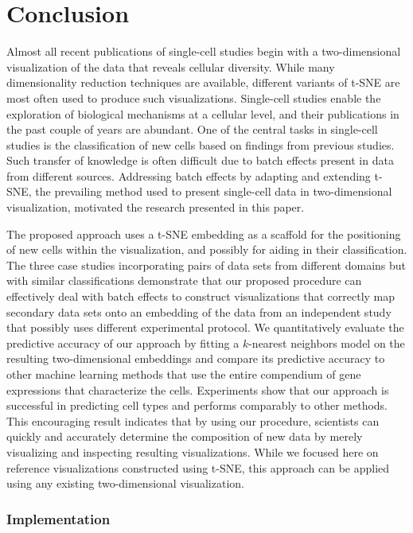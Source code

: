 \documentclass[runningheads]{llncs}
\begin{document}
\section{Conclusion}

Almost all recent publications of single-cell studies begin with a
two-dimensional visualization of the data that reveals cellular diversity.
While many dimensionality reduction techniques are available, different 
variants of t-SNE are most often used to produce such
visualizations. Single-cell studies enable the exploration of biological mechanisms at a
cellular level, and their publications in the past couple of years are abundant.
One of the central tasks in single-cell
studies is the classification of new cells based on findings from previous
studies. Such transfer of knowledge is often difficult due to batch effects
present in data from different sources. Addressing batch effects by adapting
and extending t-SNE, the prevailing method used to present single-cell data in
two-dimensional visualization, motivated the research presented in this paper.

The proposed approach uses a t-SNE embedding as a scaffold for the positioning of new cells within the visualization, and possibly for aiding in their classification. The three case studies incorporating pairs of data sets from different domains but with similar classifications demonstrate that our proposed procedure can effectively deal with batch effects to construct visualizations that correctly map secondary data sets onto an embedding of the data from an independent study that possibly uses different experimental protocol. We quantitatively evaluate the predictive accuracy of our approach by fitting a $k$-nearest neighbors model on the resulting two-dimensional embeddings and compare its predictive accuracy to other machine learning methods that use the entire compendium of gene expressions that characterize the cells. Experiments show that our approach is successful in predicting cell types and performs comparably to other methods. This encouraging result indicates that by using our procedure, scientists can quickly and accurately determine the composition of new data by merely visualizing and inspecting resulting visualizations. While we focused here on reference visualizations constructed using t-SNE, this approach can be applied using any existing two-dimensional visualization.


\subsubsection*{Implementation\label{sec:implementation}}
\end{document}
